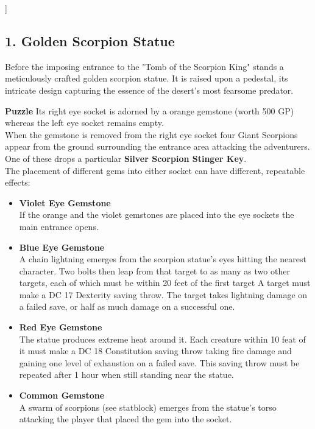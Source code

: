 {\begin{minipage}{\paperwidth}
\end{minipage}}]

\subsection*{1. Golden Scorpion Statue}
{\entryfont
	Before the imposing entrance to the "Tomb of the Scorpion King" stands a meticulously crafted golden scorpion statue. It is raised upon a pedestal, its intricate design capturing the essence of the desert's most fearsome predator.
	
	\textbf{Puzzle} Its right eye socket is adorned by a orange gemstone (worth 500 GP) whereas the left eye socket remains empty.\\
	When the gemstone is removed from the right eye socket four Giant Scorpions appear from the ground surrounding the entrance area attacking the adventurers. One of these drops a particular \textbf{Silver Scorpion Stinger Key}.\\
	The placement of different gems into either socket can have different, repeatable effects:
	\begin{itemize}
		\item \textbf{Violet Eye Gemstone}\\ If the orange and the violet gemstones are placed into the eye sockets the main entrance opens.
		\item \textbf{Blue Eye Gemstone}\\A chain lightning emerges from the scorpion statue's eyes hitting the nearest character. Two bolts then leap from that target to as many as two other targets, each of which must be within 20 feet of the first target A target must make a DC 17 Dexterity saving throw. The target takes  lightning damage on a failed save, or half as much damage on a successful one.
		\vfill\eject
		\item \textbf{Red Eye Gemstone}\\
		The statue produces extreme heat around it. Each creature within 10 feat of it must make a DC 18 Constitution saving throw taking  fire damage and gaining one level of exhaustion on a failed save. This saving throw must be repeated after 1 hour when still standing near the statue.
		\item \textbf{Common Gemstone}\\
		A swarm of scorpions (see statblock) emerges from the statue's torso attacking the player that placed the gem into the socket.
	\end{itemize}
}


